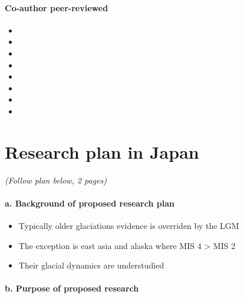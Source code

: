 \documentclass{article}
\begin{document}
\paragraph{Co-author peer-reviewed}

    \begin{itemize}
      \item{}
      \item{}
      \item{}
      \item{}
      \item{}
      \item{}
      \item{}
      \item{}
    \end{itemize}


\section{Research plan in Japan}

    \emph{(Follow plan below, 2 pages)}

\paragraph{a. Background of proposed research plan}

    \begin{itemize}
      \item{Typically older glaciations evidence is overriden by the LGM}
      \item{The exception is east asia and alaska where MIS 4 > MIS 2}
      \item{Their glacial dynamics are understudied}
    \end{itemize}

\paragraph{b. Purpose of proposed research}
\end{document}
